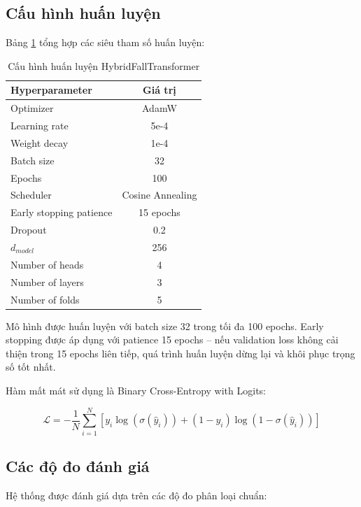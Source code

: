 \subsection{Cấu hình huấn luyện}
\label{sec:training_config}

Bảng \ref{tab:training_config} tổng hợp các siêu tham số huấn luyện:

\begin{table}[h]
\centering
\caption{Cấu hình huấn luyện HybridFallTransformer}
\label{tab:training_config}
\begin{tabular}{|l|c|}
\hline
\textbf{Hyperparameter} & \textbf{Giá trị} \\
\hline
Optimizer & AdamW \\
\hline
Learning rate & 5e-4 \\
\hline
Weight decay & 1e-4 \\
\hline
Batch size & 32 \\
\hline
Epochs & 100 \\
\hline
Scheduler & Cosine Annealing \\
\hline
Early stopping patience & 15 epochs \\
\hline
Dropout & 0.2 \\
\hline
$d_{model}$ & 256 \\
\hline
Number of heads & 4 \\
\hline
Number of layers & 3 \\
\hline
Number of folds & 5 \\
\hline
\end{tabular}
\end{table}

Mô hình được huấn luyện với batch size 32 trong tối đa 100 epochs. Early stopping được áp dụng với patience 15 epochs -- nếu validation loss không cải thiện trong 15 epochs liên tiếp, quá trình huấn luyện dừng lại và khôi phục trọng số tốt nhất.

Hàm mất mát sử dụng là Binary Cross-Entropy with Logits:

\begin{equation}
\mathcal{L} = -\frac{1}{N} \sum_{i=1}^{N} \left[ y_i \log(\sigma(\hat{y}_i)) + (1 - y_i) \log(1 - \sigma(\hat{y}_i)) \right]
\end{equation}

\subsection{Các độ đo đánh giá}
\label{sec:metrics}

Hệ thống được đánh giá dựa trên các độ đo phân loại chuẩn:

